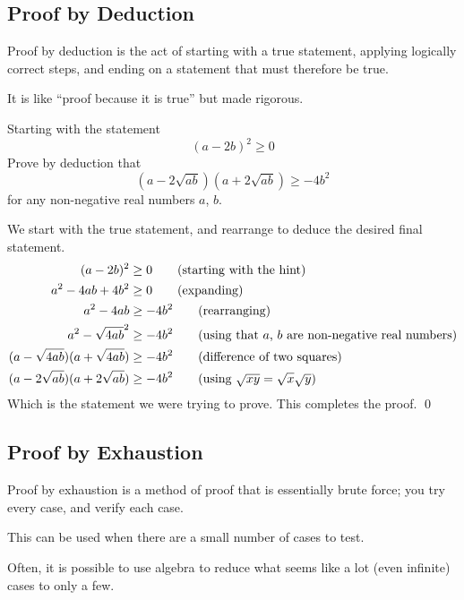 \subsection{Proof by Deduction}

Proof by deduction is the act of starting with a true statement, applying logically correct steps, and ending on a statement that must therefore be true.

It is like ``proof because it is true'' but made rigorous.

\begin{example}
    
    Starting with the statement 
    \[(a - 2b)^2 \geq 0\]
    Prove by deduction that 
    \[ (a - 2\sqrt{ab})(a + 2\sqrt{ab}) \geq - 4b^2\]
    for any non-negative real numbers $a$, $b$.
\end{example}
\begin{solution}
    We start with the true statement, and rearrange to deduce the desired final statement.
        \begin{align*}
        (a - 2b)^2 &\geq 0 \tag{starting with the hint} \\
        a^2 - 4ab + 4b^2  &\geq 0 \tag{expanding} \\
        a^2 - 4ab  &\geq -4b^2 \tag{rearranging} \\
        a^2 - \sqrt{4ab}^2 & \geq - 4b^2 \tag{using that $a$, $b$ are non-negative real numbers}\\
        (a - \sqrt{4ab})(a + \sqrt{4ab}) & \geq - 4b^2 \tag{difference of two squares}\\
        (a - 2\sqrt{ab})(a + 2\sqrt{ab})&\geq - 4b^2 \tag{using $\sqrt{xy} = \sqrt{x}\sqrt{y}$}
        \end{align*}
    Which is the statement we were trying to prove. This completes the proof.
    \qed
\end{solution}


\subsection{Proof by Exhaustion}

Proof by exhaustion is a method of proof that is essentially brute force; you try every case, and verify each case.

This can be used when there are a small number of cases to test.

Often, it is possible to use algebra to reduce what seems like a lot (even infinite) cases to only a few.

